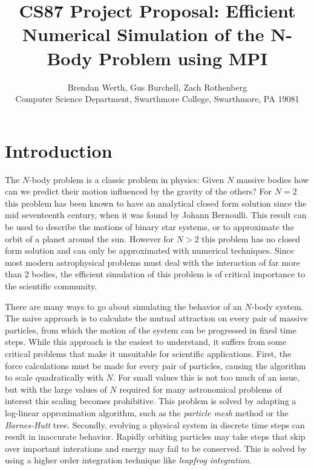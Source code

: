 \documentclass[11pt]{article}
\begin{document}

\title{CS87 Project Proposal: 
Efficient Numerical Simulation of the N-Body Problem using MPI}

\author{Brendan Werth, Gus Burchell, Zach Rothenberg\\
Computer Science Department, Swarthmore College, Swarthmore, PA  19081}

\maketitle

\section {Introduction}\label{intro}
The $N$-body problem is a classic problem in physics: Given $N$ massive bodies how can we predict their motion influenced by the gravity of the others? For $N = 2$ this problem has been known to have an analytical closed form solution since the mid seventeenth century, when it was found by Johann Bernoulli. This result can be used to describe the motions of binary star systems, or to approximate the orbit of a planet around the sun. However for $N > 2$ this problem has no closed form solution and can only be approximated with numerical techniques. Since most modern astrophysical problems must deal with the interaction of far more than $2$ bodies, the efficient simulation of this problem is of critical importance to the scientific community.

There are many ways to go about simulating the behavior of an $N$-body system. The naive approach is to calculate the mutual attraction on every pair of massive particles, from which the motion of the system can be progressed in fixed time steps. While this approach is the easiest to understand, it suffers from some critical problems that make it unsuitable for scientific applications. First, the force calculations must be made for every pair of particles, causing the algorithm to scale quadratically with $N$. For small values this is not too much of an issue, but with the large values of $N$ required for many astronomical problems of interest this scaling becomes prohibitive. This problem is solved by adapting a log-linear approximation algorithm, such as the \emph{particle mesh} method or the \emph{Barnes-Hutt} tree. Secondly, evolving a physical system in discrete time steps can result in inaccurate behavior. Rapidly orbiting particles may take steps that skip over important interations and energy may fail to be conserved. This is solved by using a higher order integration technique like \emph{leapfrog integration}.
\end{document}

